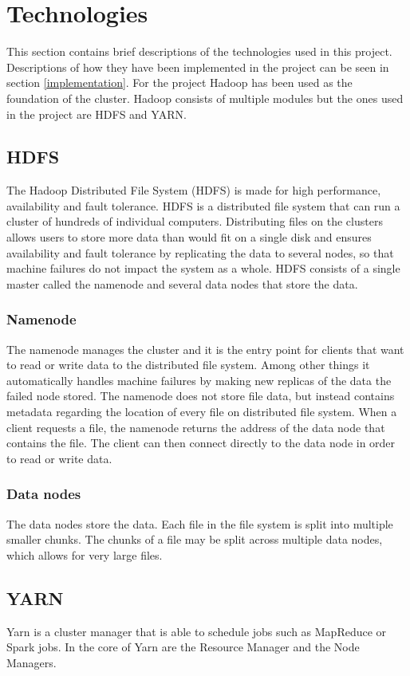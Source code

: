 \documentclass[main.tex]{subfiles}
\begin{document}
\section{Technologies}
This section contains brief descriptions of the technologies used in this project. Descriptions of how they have been implemented in the project can be seen in section \ref{implementation}. For the project Hadoop has been used as the foundation of the cluster. Hadoop consists of multiple modules but the ones used in the project are HDFS and YARN.\cite{Hadoop}

\subsection{HDFS}
The Hadoop Distributed File System (HDFS) is made for high performance, availability and fault tolerance. HDFS is a distributed file system that can run a cluster of hundreds of individual computers. Distributing files on the clusters allows users to store more data than would fit on a single disk and ensures availability and fault tolerance by replicating the data to several nodes, so that machine failures do not impact the system as a whole. HDFS consists of a single master called the namenode and several data nodes that store the data.

\subsubsection{Namenode}
The namenode manages the cluster and it is the entry point for clients that want to read or write data to the distributed file system. Among other things it automatically handles machine failures by making new replicas of the data the failed node stored. The namenode does not store file data, but instead contains metadata regarding the location of every file on distributed file system. When a client requests a file, the namenode returns the address of the data node that contains the file. The client can then connect directly to the data node in order to read or write data.

\subsubsection{Data nodes}
The data nodes store the data. Each file in the file system is split into multiple smaller chunks. The chunks of a file may be split across multiple data nodes, which allows for very large files. 


\subsection{YARN}
Yarn is a cluster manager that is able to schedule jobs such as MapReduce or Spark jobs. In the core of Yarn are the Resource Manager and the Node Managers. 
\end{document}
